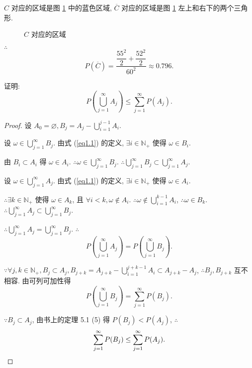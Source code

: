 \documentclass{ctexart}
\begin{document}
\begin{solution}
    $C$ 对应的区域是图 \ref{f1.3} 中的蓝色区域, $\overline{C}$ 对应的区域是图 \ref{f1.3} 左上和右下的两个三角形.
    \begin{figure}[htbp!]
        \centering
        \caption{$C$ 对应的区域}\label{f1.3}
    \end{figure}

    $\therefore$
    \[P(\overline{C})=\dfrac{\dfrac{55^2}{2}+\dfrac{52^2}{2}}{60^2}\approx0.796.\]
\end{solution}
\addtocounter{exercise}{2}
\begin{exercise}%
    证明:
    \[P\left(\bigcup\limits_{j=1}^\infty A_j\right)\leq\sum\limits_{j=1}^\infty P(A_j).\]
\end{exercise}
\begin{proof}
    设 $A_0=\varnothing,B_j=A_j-\bigcup\limits_{i=1}^{j-1}A_i$.

    设 $\omega\in\bigcup\limits_{j=1}^\infty B_j$. 由式 (\ref{eq1.1}) 的定义, $\exists i\in\mathbb{N}_+$ 使得 $\omega\in B_i$.
    
    由 $B_i\subset A_i$ 得 $\omega\in A_i$. $\therefore\omega\in\bigcup\limits_{j=1}^\infty B_j$. $\therefore\bigcup\limits_{j=1}^\infty B_j\subset\bigcup\limits_{j=1}^\infty A_j$.

    设 $\omega\in\bigcup\limits_{j=1}^\infty A_j$. 由式 (\ref{eq1.1}) 的定义, $\exists i\in\mathbb{N}_+$ 使得 $\omega\in A_i$.
    
    $\therefore\exists k\in\mathbb{N}_+$ 使得 $\omega\in A_k$, 且 $\forall i<k,\omega\notin A_i$. $\therefore\omega\notin\bigcup\limits_{i=1}^{k-1}A_i$, $\therefore\omega\in B_k$. $\therefore\bigcup\limits_{j=1}^\infty A_j\subset\bigcup\limits_{j=1}^\infty B_j$.
    
    $\therefore\bigcup\limits_{j=1}^\infty A_j=\bigcup\limits_{j=1}^\infty B_j$. $\therefore$
    \[P\left(\bigcup\limits_{j=1}^\infty A_j\right)=P\left(\bigcup\limits_{j=1}^\infty B_j\right).\]

    $\because\forall j,k\in\mathbb{N}_+,B_j\subset A_j,B_{j+k}=A_{j+k}-\bigcup\limits_{i=1}^{j+k-1}A_i\subset  A_{j+k}-A_j$, $\therefore B_j,B_{j+k}$ 互不相容. 由可列可加性得
    \[P\left(\bigcup\limits_{j=1}^\infty B_j\right)=\sum\limits_{j=1}^\infty P(B_j).\]

    $\because B_j\subset A_j$, 由书上的定理 5.1 (5) 得 $P(B_j)<P(A_j)$, $\therefore$
    \[\sum\limits_{j=1}^\infty P(B_j)\leq\sum\limits_{j=1}^\infty P(A_j).\qedhere\]
\end{proof}
\end{document}
